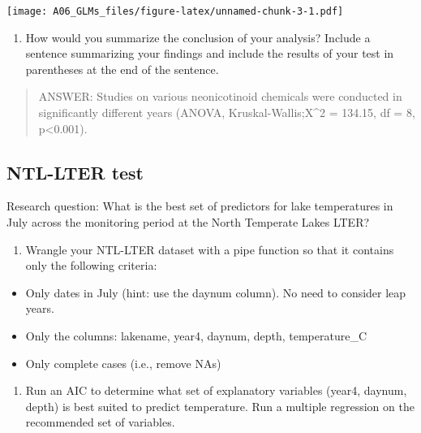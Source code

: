 \documentclass[]{article}
\providecommand{\tightlist}{%
  \setlength{\itemsep}{0pt}\setlength{\parskip}{0pt}}
\begin{document}
\texttt{[image: A06\_GLMs\_files/figure-latex/unnamed-chunk-3-1.pdf]}

\begin{enumerate}
\def\labelenumi{\arabic{enumi}.}
\setcounter{enumi}{8}
\tightlist
\item
  How would you summarize the conclusion of your analysis? Include a
  sentence summarizing your findings and include the results of your
  test in parentheses at the end of the sentence.
\end{enumerate}

\begin{quote}
ANSWER: Studies on various neonicotinoid chemicals were conducted in
significantly different years (ANOVA, Kruskal-Wallis;X\^{}2 = 134.15, df
= 8, p\textless{}0.001).
\end{quote}

\subsection{NTL-LTER test}\label{ntl-lter-test}

Research question: What is the best set of predictors for lake
temperatures in July across the monitoring period at the North Temperate
Lakes LTER?

\begin{enumerate}
\def\labelenumi{\arabic{enumi}.}
\setcounter{enumi}{10}
\tightlist
\item
  Wrangle your NTL-LTER dataset with a pipe function so that it contains
  only the following criteria:
\end{enumerate}

\begin{itemize}
\tightlist
\item
  Only dates in July (hint: use the daynum column). No need to consider
  leap years.
\item
  Only the columns: lakename, year4, daynum, depth, temperature\_C
\item
  Only complete cases (i.e., remove NAs)
\end{itemize}

\begin{enumerate}
\def\labelenumi{\arabic{enumi}.}
\setcounter{enumi}{11}
\tightlist
\item
  Run an AIC to determine what set of explanatory variables (year4,
  daynum, depth) is best suited to predict temperature. Run a multiple
  regression on the recommended set of variables.
\end{enumerate}
\end{document}
